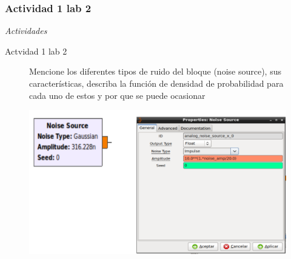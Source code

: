 \subsubsection{Actividad 1 lab 2}
\begin{frame}{}


\begin{block}{}
	\centering
	\vspace{1mm}
	\large{\textit{Actividades}}
	\vspace{1mm}
\end{block}
\end{frame}


\begin{frame}{Actvidad 1 lab 2}
\begin{figure}[H]
\begin{flushleft}
Mencione los diferentes tipos de ruido del bloque (noise source), sus características,
describa la función de densidad de probabilidad para cada uno de estos y por que se puede ocasionar
\end{flushleft}
\centering
\includegraphics[width=\textwidth, height=0.58\textwidth]{parte1/lab2/pdf/lab2_17.pdf}
\end{figure}
\end{frame}

